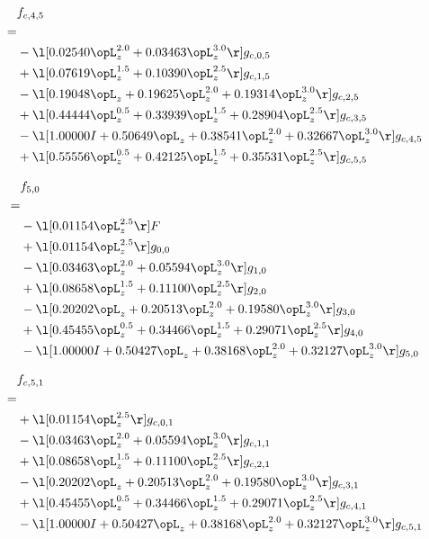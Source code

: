 \begin{alignat}{2} 
\label{eq:f_45_0} 
& f_{c,4,5} \nonumber \\ 
 = \\ 
& - \l[  0.02540 \opL_z^{2.0} +  0.03463 \opL_z^{3.0}  \r] g_{c,0,5} \nonumber \\ 
& + \l[  0.07619 \opL_z^{1.5} +  0.10390 \opL_z^{2.5}  \r] g_{c,1,5} \nonumber \\ 
& - \l[  0.19048 \opL_z +  0.19625 \opL_z^{2.0} +  0.19314 \opL_z^{3.0}  \r] g_{c,2,5} \nonumber \\ 
& + \l[  0.44444 \opL_z^{0.5} +  0.33939 \opL_z^{1.5} +  0.28904 \opL_z^{2.5}  \r] g_{c,3,5} \nonumber \\ 
& - \l[  1.00000 I +  0.50649 \opL_z +  0.38541 \opL_z^{2.0} +  0.32667 \opL_z^{3.0}  \r] g_{c,4,5} \nonumber \\ 
& + \l[  0.55556 \opL_z^{0.5} +  0.42125 \opL_z^{1.5} +  0.35531 \opL_z^{2.5}  \r] g_{c,5,5} \nonumber \\ 
\end{alignat} 


\begin{alignat}{2} 
\label{eq:f_50_0} 
& f_{5,0} \nonumber \\ 
 = \\ 
& - \l[  0.01154 \opL_z^{2.5}  \r] F \nonumber \\ 
& + \l[  0.01154 \opL_z^{2.5}  \r] g_{0,0} \nonumber \\ 
& - \l[  0.03463 \opL_z^{2.0} +  0.05594 \opL_z^{3.0}  \r] g_{1,0} \nonumber \\ 
& + \l[  0.08658 \opL_z^{1.5} +  0.11100 \opL_z^{2.5}  \r] g_{2,0} \nonumber \\ 
& - \l[  0.20202 \opL_z +  0.20513 \opL_z^{2.0} +  0.19580 \opL_z^{3.0}  \r] g_{3,0} \nonumber \\ 
& + \l[  0.45455 \opL_z^{0.5} +  0.34466 \opL_z^{1.5} +  0.29071 \opL_z^{2.5}  \r] g_{4,0} \nonumber \\ 
& - \l[  1.00000 I +  0.50427 \opL_z +  0.38168 \opL_z^{2.0} +  0.32127 \opL_z^{3.0}  \r] g_{5,0} \nonumber \\ 
\end{alignat} 


\begin{alignat}{2} 
\label{eq:f_51_0} 
& f_{c,5,1} \nonumber \\ 
 = \\ 
& + \l[  0.01154 \opL_z^{2.5}  \r] g_{c,0,1} \nonumber \\ 
& - \l[  0.03463 \opL_z^{2.0} +  0.05594 \opL_z^{3.0}  \r] g_{c,1,1} \nonumber \\ 
& + \l[  0.08658 \opL_z^{1.5} +  0.11100 \opL_z^{2.5}  \r] g_{c,2,1} \nonumber \\ 
& - \l[  0.20202 \opL_z +  0.20513 \opL_z^{2.0} +  0.19580 \opL_z^{3.0}  \r] g_{c,3,1} \nonumber \\ 
& + \l[  0.45455 \opL_z^{0.5} +  0.34466 \opL_z^{1.5} +  0.29071 \opL_z^{2.5}  \r] g_{c,4,1} \nonumber \\ 
& - \l[  1.00000 I +  0.50427 \opL_z +  0.38168 \opL_z^{2.0} +  0.32127 \opL_z^{3.0}  \r] g_{c,5,1} \nonumber \\ 
\end{alignat} 


